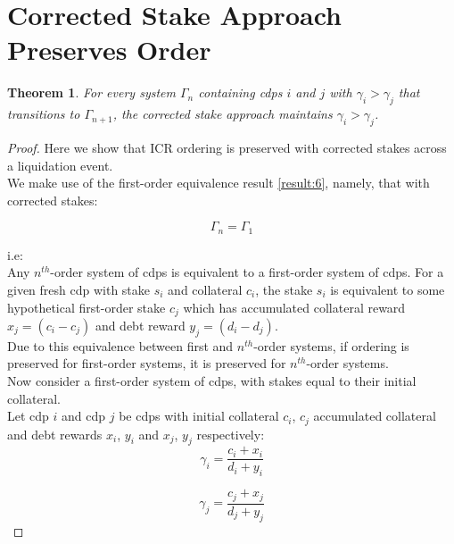 \documentclass[reqno]{article}
\newtheorem{theorem}{Theorem}[section]
\begin{document}
\section{Corrected Stake Approach Preserves Order}

\begin{theorem} \label{result:8}
  For every system $\Gamma_n$ containing cdps $i$ and $j$ with $\gamma_i > \gamma_j$ that transitions to $\Gamma_{n+1}$, the corrected stake approach maintains $\gamma_i > \gamma_j$.
\end{theorem}

\begin{proof}
Here we show that ICR ordering is preserved with corrected stakes across a liquidation event.\\

We make use of the first-order equivalence result \ref{result:6}, namely, that with corrected stakes:

\begin{equation} 
    \Gamma_n = \Gamma_1
\end{equation}

i.e:\\

Any $n^{th}$-order system of cdps is equivalent to a first-order system of cdps. For a given fresh cdp with stake $s_i$ and collateral $c_i$, the stake $s_i$ is equivalent to some hypothetical first-order stake $c_j$ which has accumulated collateral reward $x_j = (c_i - c_j)$ and debt reward $y_j = (d_i - d_j)$.\\

Due to this equivalence between first and $n^{th}$-order systems, if ordering is preserved for first-order systems, it is preserved for $n^{th}$-order systems.\\

Now consider a first-order system of cdps, with stakes equal to their initial collateral.\\

Let cdp $i$ and cdp $j$ be cdps with initial collateral $c_i$, $c_j$ accumulated collateral and debt rewards $x_i$, $y_i$ and $x_j$, $y_j$ respectively:\\

\begin{equation} 
    \gamma_i=\frac{c_i+x_i}{d_i+y_i}
\end{equation}

\begin{equation} 
    \gamma_j=\frac{c_j+x_j}{d_j+y_j}
\end{equation}


\end{proof}
\end{document}
